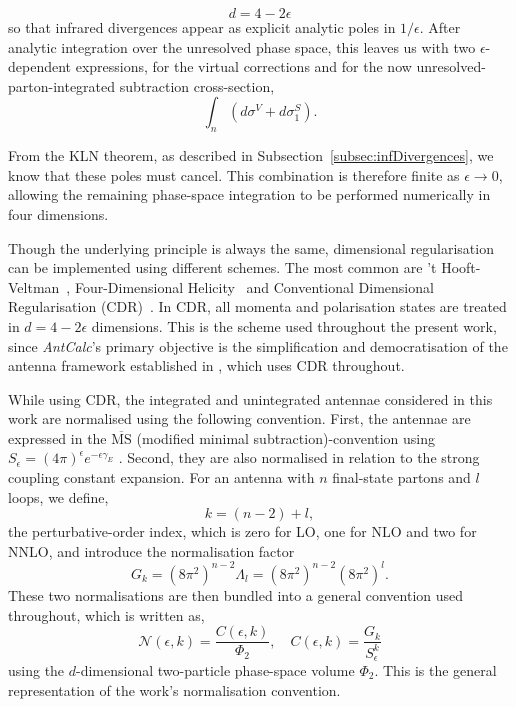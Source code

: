 \begin{equation}
    d=4-2\epsilon
\end{equation}
so that infrared divergences appear as explicit analytic poles in $1/\epsilon$. After
analytic integration over the unresolved phase space, this leaves us with two
$\epsilon$-dependent expressions, for the virtual corrections and for the now
unresolved-parton-integrated subtraction cross-section,
\begin{equation}
    \int_n\left(d\sigma^V+d\sigma^S_1\right).
\end{equation}

From the KLN theorem, as described in Subsection~\ref{subsec:infDivergences}, we know
that these poles must cancel. This combination is therefore finite as $\epsilon\to0$,
allowing the remaining phase-space integration to be performed numerically in four
dimensions.

Though the underlying principle is always the same, dimensional regularisation can
be implemented using different schemes. The most common are
't Hooft-Veltman~\cite{tHooft:1972tcz}, Four-Dimensional Helicity~\cite{Bern:1991aq}
and Conventional Dimensional Regularisation (CDR)~\cite{Ellis:1996mzs}. In CDR, all
momenta and polarisation states are treated in $d=4-2\epsilon$ dimensions. This is
the scheme used throughout the present work, since \textit{AntCalc}'s primary
objective is the simplification and democratisation of the antenna framework
established in \cite{Gehrmann-DeRidder:2005btv}, which uses CDR throughout.

While using CDR, the integrated and unintegrated antennae considered in this 
work are normalised using the following convention. First, the antennae are 
expressed in the $\overline{\text{MS}}$ (modified minimal subtraction)-convention 
using $S_\epsilon=(4\pi)^{\epsilon}e^{-\epsilon\gamma_E}$ \cite{Gehrmann-DeRidder:2005btv}. 
Second, they are also normalised in relation to the strong coupling constant
expansion. For an antenna with $n$ final-state partons and $l$ loops, we define,
\begin{equation}\label{eq:kOrder}
    k=(n-2)+l,
\end{equation}
the perturbative-order index, which is zero for LO, one for NLO and two for NNLO,
and introduce the normalisation factor
\begin{equation}\label{eq:loopNorm}
    G_k=\left(8\pi^2\right)^{n-2}\Lambda_l=\left(8\pi^2\right)^{n-2}\left(8\pi^2\right)^{l}.
\end{equation}
These two normalisations are then bundled into a general convention used
throughout, which is written as,
\begin{equation}\label{eq:normN}
    \mathcal N(\epsilon,k)=\frac{C(\epsilon,k)}{\Phi_2},\quad C(\epsilon,k)=\frac{G_k}{S_\epsilon^k}
\end{equation}
using the $d$-dimensional two-particle phase-space volume $\Phi_2$. This is the
general representation of the work's normalisation convention.


